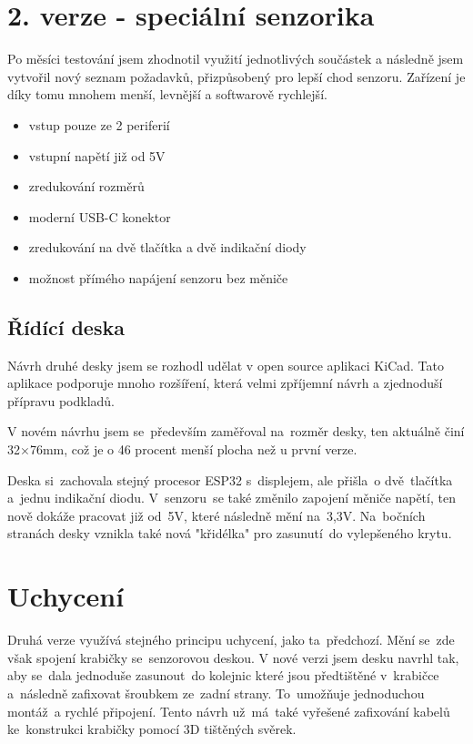 \newpage





\section{2. verze - speciální senzorika}

Po měsíci testování jsem zhodnotil využití jednotlivých součástek a následně jsem vytvořil nový seznam požadavků, přizpůsobený pro lepší chod senzoru.
Zařízení je díky tomu mnohem menší, levnější a softwarově rychlejší.

\begin{itemize}
    \item vstup pouze ze 2 periferií
    \item vstupní napětí již od 5V
    \item zredukování rozměrů
    \item moderní USB-C konektor
    \item zredukování na dvě tlačítka a dvě indikační diody
    \item možnost přímého napájení senzoru bez měniče
\end{itemize}

\subsection{Řídící deska}
Návrh druhé desky jsem se rozhodl udělat v open source aplikaci KiCad.
Tato aplikace podporuje mnoho rozšíření, která velmi zpříjemní návrh a zjednoduší přípravu podkladů.

V novém návrhu jsem se~především zaměřoval na~rozměr desky, ten aktuálně činí 32$\times$76mm, což je o 46 procent menší plocha než u první verze.

Deska si~zachovala stejný procesor ESP32 s~displejem, ale přišla~o dvě~tlačítka a~jednu indikační diodu.
V~senzoru~se také změnilo zapojení měniče napětí, ten nově dokáže pracovat již od~5V, které následně mění na~3,3V.
Na~bočních stranách desky vznikla také nová "křidélka" pro zasunutí~do vylepšeného krytu.



\section{Uchycení}
Druhá verze využívá stejného principu uchycení, jako ta~předchozí. 
Mění se~zde však spojení krabičky se~senzorovou deskou. 
V nové verzi jsem desku navrhl tak, aby se~dala jednoduše zasunout~do kolejnic které jsou předtištěné v~krabičce a~následně zafixovat šroubkem ze~zadní strany.
To~umožňuje jednoduchou montáž~a rychlé připojení.
Tento návrh už~má~také vyřešené zafixování kabelů ke~konstrukci krabičky pomocí 3D tištěných svěrek.


